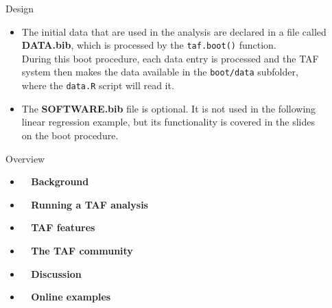 \documentclass[aspectratio=169]{beamer}
\begin{document}
\begin{frame}{Design}\small
  \begin{itemize}
    \item[] The initial data that are used in the analysis are declared in a
    file called\\[0.2ex]
    {\bf\darkblue DATA.bib}, which is processed by the {\tt\blue taf.boot()}
    function.\\[4ex]
    During this boot procedure, each data entry is processed and the
    TAF\\[0.2ex]
    system then makes the data available in the {\tt boot/data}
    subfolder,\\[0.2ex]
    where the {\tt data.R} script will read it.\\[4ex]
    \item[] The {\bf\orange SOFTWARE.bib} file is optional. It is not used in
    the following\\
    linear regression example, but its functionality is covered in the slides\\
    on the boot procedure.
  \end{itemize}
\end{frame}


\begin{frame}{Overview}
  \begin{itemize}
    \item[] {\bf{}~ Background} \\[3ex]
    \item[] {\bf{}~ Running a TAF analysis} \\[3ex]
    \item[] {\bf{}~ TAF features} \\[3ex]
    \item[] {\bf{}~ The TAF community} \\[3ex]
    \item[] {\bf{}~ Discussion} \\[3ex]
    \item[] {\bf{}~ Online examples} \\[3ex]
  \end{itemize}
\end{frame}
\end{document}
